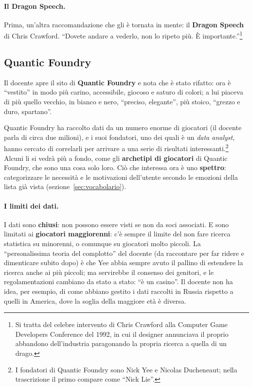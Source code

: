 \paragraph{Il Dragon Speech.} Prima, un'altra raccomandazione che gli è tornata
in mente: il \textbf{Dragon Speech} di Chris Crawford. ``Dovete andare a
vederlo, non lo ripeto più. È importante.''\footnote{Si tratta del celebre
intervento di Chris Crawford alla Computer Game Developers Conference del
1992, in cui il designer annunciava il proprio abbandono dell'industria
paragonando la propria ricerca a quella di un drago.}

\subsection{Quantic Foundry}

Il docente apre il sito di \textbf{Quantic Foundry} e nota che è stato
rifatto: ora è ``vestito'' in modo più carino, accessibile, giocoso e saturo di
colori; a lui piaceva di più quello vecchio, in bianco e nero, ``preciso,
elegante'', più stoico, ``grezzo e duro, spartano''.

Quantic Foundry ha raccolto dati da un numero enorme di giocatori (il
docente parla di circa due milioni), e i suoi fondatori, uno dei quali è un
\emph{data analyst}, hanno cercato di correlarli per arrivare a una serie di
risultati interessanti.\footnote{I fondatori di Quantic Foundry sono Nick Yee
e Nicolas Ducheneaut; nella trascrizione il primo compare come ``Nick Lie''.}
Alcuni li si vedrà più a fondo, come gli \textbf{archetipi di giocatori} di
Quantic Foundry, che sono una cosa solo loro. Ciò che interessa ora è uno
\textbf{spettro}: categorizzare le necessità e le motivazioni dell'utente
secondo le emozioni della lista già vista (sezione~\ref{sec:vocabolario}).

\paragraph{I limiti dei dati.} I dati sono \textbf{chiusi}: non possono essere
visti se non da soci associati. E sono limitati ai \textbf{giocatori
maggiorenni}: c'è sempre il limite del non fare ricerca statistica su
minorenni, o comunque su giocatori molto piccoli. La ``personalissima teoria
del complotto'' del docente (da raccontare per far ridere e dimenticare
subito dopo) è che Yee abbia sempre avuto il pallino di estendere la ricerca
anche ai più piccoli; ma servirebbe il consenso dei genitori, e le
regolamentazioni cambiano da stato a stato: ``è un casino''. Il docente non
ha idea, per esempio, di come abbiano gestito i dati raccolti in Russia
rispetto a quelli in America, dove la soglia della maggiore età è diversa.


